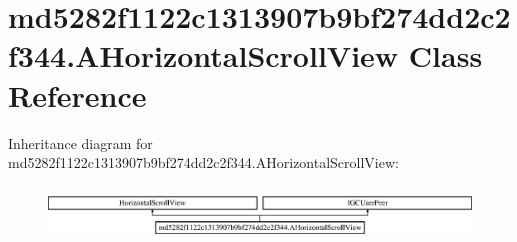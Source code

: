 \hypertarget{classmd5282f1122c1313907b9bf274dd2c2f344_1_1AHorizontalScrollView}{}\section{md5282f1122c1313907b9bf274dd2c2f344.\+A\+Horizontal\+Scroll\+View Class Reference}
\label{classmd5282f1122c1313907b9bf274dd2c2f344_1_1AHorizontalScrollView}
Inheritance diagram for md5282f1122c1313907b9bf274dd2c2f344.\+A\+Horizontal\+Scroll\+View\+:\begin{figure}[H]
\begin{center}
\leavevmode
\includegraphics[height=1.439589cm]{classmd5282f1122c1313907b9bf274dd2c2f344_1_1AHorizontalScrollView}
\end{center}
\end{figure}
